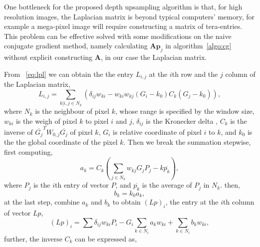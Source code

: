 One bottleneck for the proposed depth upsampling algorithm is that, for high resolution images, the Laplacian matrix is beyond typical computers' memory, for example a mega-pixel image will require constructing a matrix of tera-entries. This problem can be effective solved with some modifications on the naive conjugate gradient method, namely calculating $\textbf{A}\textbf{p}_j$ in algorithm~\ref{algo:cg} without explicit constructing $\textbf{A}$, in our case the Laplacian matrix.

From ~\eqref{eq:lpl} we can obtain the the entry $L_{i,j}$ at the $i$th row and the $j$ column of the Laplacian matrix, 
\begin{equation}
L_{i,j} = \sum_{k|i,j\in N_{k}}{(\delta_{ij}w_{ki}-w_{ki}w_{kj}(G_{i}-k_{0})C_{k}(G_{j}-k_{0}))},
\label{eq:2.cgs_partial1}
\end{equation}
where $N_{k}$ is the neighbour of pixel $k$, whose range is specified by the window size, $w_{ki}$ is the weigh of pixel $k$ to pixel $i$ and $j$, $\delta_{ij}$ is the Kronecker delta , $C_{k}$ is the inverse of $\overline{G_{j}}^{T}W_{0,j}\overline{G_{j}}$ of pixel $k$, $G_{i}$ is relative coordinate of pixel $i$ to $k$, and $k_0$ is the the global coordinate of the pixel $k$. Then we break the summation stepwise, first computing, 
\begin{equation}
a_{k} = C_{k}(\sum_{j\in N_{k}}{w_{kj}}G_{j}P_{j}-k\overline{p_{k}}),
\label{eq:2.cgs_partial2}
\end{equation}
where $P_j$ is the $i$th entry of vector $P$, and $\overline{p_{k}}$ is the average of $P_j$ in $N_{k}$. then,
\begin{equation}
b_{k} = k_{0}a_{k},
\label{eq:2.cgs_partial3}
\end{equation}
at the last step, combine $a_k$ and $b_k$ to obtain $(Lp)_{i}$, the entry at the $i$th column of vector $Lp$,
\begin{equation}
(Lp)_{i} = \sum{\delta_{ij}w_{ki}P_{i}}-G_{i}\sum_{k\in N_{i}}{a_{k}w_{ki}}+\sum_{k\in N_{i}}{b_{k}w_{ki}},
\label{eq:2.cgs_final}
\end{equation}
further, the inverse $C_k$ can be expressed as,
